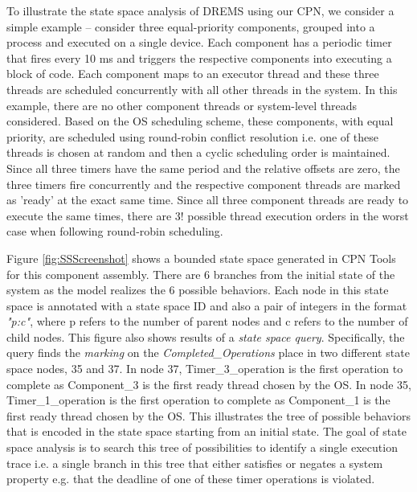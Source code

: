 To illustrate the state space analysis of DREMS using our CPN, we consider a simple example -- consider three equal-priority components, grouped into a process and executed on a single device. Each component has a periodic timer that fires every 10 ms and triggers the respective components into executing a block of code. Each component maps to an executor thread and these three threads are scheduled concurrently with all other threads in the system. In this example, there are no other component threads or system-level threads considered. Based on the OS scheduling scheme, these components, with equal priority, are scheduled using round-robin conflict resolution i.e. one of these threads is chosen at random and then a cyclic scheduling order is maintained. Since all three timers have the same period and the relative offsets are zero, the three timers fire concurrently and the respective component threads are marked as 'ready' at the exact same time. Since all three component threads are ready to execute the same times, there are $3!$ possible thread execution orders in the worst case when following round-robin scheduling. 

Figure \ref{fig:SSScreenshot} shows a bounded state space generated in CPN Tools for this component assembly. There are 6 branches from the initial state of the system as the model realizes the 6 possible behaviors. Each node in this state space is annotated with a state space ID and also a pair of integers in the format \emph{"p:c"}, where p refers to the number of parent nodes and c refers to the number of child nodes. This figure also shows results of a \emph{state space query}. Specifically, the query finds the \emph{marking} on the \emph{Completed\_Operations} place in two different state space nodes, 35 and 37. In node 37, Timer\_3\_operation is the first operation to complete as Component\_3 is the first ready thread chosen by the OS. In node 35, Timer\_1\_operation is the first operation to complete as Component\_1 is the first ready thread chosen by the OS. This illustrates the tree of possible behaviors that is encoded in the state space starting from an initial state. The goal of state space analysis is to search this tree of possibilities to identify a single execution trace i.e. a single branch in this tree that either satisfies or negates a system property e.g. that the deadline of one of these timer operations is violated. 


